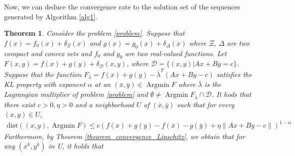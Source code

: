 \documentclass{article}
\numberwithin{equation}{section}
\newtheorem{theorem}{Theorem}[section]
\def\Argmin{\mathop{\mathrm{Argmin}}}
\begin{document}
Now, we can deduce the convergence rate to the solution set of the sequences generated by Algorithm \ref{alg1}. 
\begin{theorem} \label{Theorem_of_KL}
    Consider the problem \eqref{problem}. Suppose that $f(x) = f_0(x) + \delta_{\Xi}(x)$ and $g(x) = g_0(x) + \delta_{\Delta}(x)$ where 
    $\Xi$, $\Delta$ are two compact and convex sets and $f_0$ and $g_0$ are two real-valued functions.     
    Let $F(x,y)= f(x)+ g(y)+ \delta_{\mathcal{D}}(x,y)$, where $\mathcal{D} = \{(x,y)| Ax+By=c\}$. Suppose that the function $F_{\bar{\lambda}} = f(x) + g(y)- \bar{\lambda}^T(Ax+By-c)$ 
    satisfies the KL property with exponent $\alpha$ at an $(\bar{x},\bar{y}) \in \Argmin F$ where $\bar{\lambda}$ is the Lagrangian multiplier of problem \eqref{problem}  
    and $\emptyset \neq \Argmin F_{\bar{\lambda}}\cap \mathcal{D}$. It hods that there exist $c>0,\eta>0$ and
    a neighborhood $U$ of $(\bar{x}, \bar{y})$ such that for every $(x,y)\in U$,  
    \begin{align} 
        \mathrm{dist}\left((x,y), \Argmin F\right) \leq c\left(f(x) + g(y)-f(\bar{x})-g(\bar{y})+\eta\|Ax+By-c\rVert\right)^{1-\alpha} \nonumber
    \end{align} 
    Furthermore, by Theorem \ref{theorem_convergence_Lipschitz}, we obtain that for any $(x^k,y^k)$ in U, it holds that 
\end{theorem}
\end{document}
